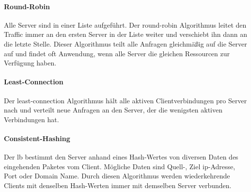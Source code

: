 \paragraph{Round-Robin}
Alle Server sind in einer Liste aufgeführt. Der round-robin Algorithmus leitet den Traffic immer an den ersten Server in der Liste weiter und verschiebt ihn dann an die letzte Stelle.
Dieser Algorithmus teilt alle Anfragen gleichmä{\ss}ig auf die Server auf und findet oft Anwendung, wenn alle Server die gleichen Ressourcen zur Verfügung haben.
\cite{WhatLoadBalancer}

\paragraph{Least-Connection}
Der least-connection Algorithmus hält alle aktiven Clientverbindungen pro Server nach und verteilt neue Anfragen an den Server, der die wenigsten aktiven Verbindungen hat.
\cite{WhatLoadBalancer}

\paragraph{Consistent-Hashing}
Der \ac{lb} bestimmt den Server anhand eines Hash-Wertes von diversen Daten des eingehenden Paketes vom Client.
Mögliche Daten sind Quell-, Ziel \ac{ip}-Adresse, Port oder Domain Name. Durch diesen Algorithmus werden wiederkehrende Clients mit denselben Hash-Werten immer mit demselben Server verbunden.
\cite{WhatLoadBalancer}

